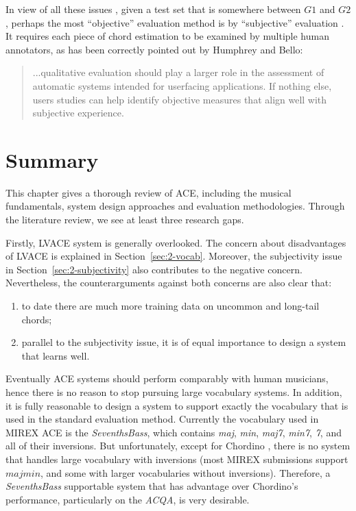 In view of all these issues \cite{humphreyfour,ni2013understanding}, given a test set that is somewhere between $G1$ and $G2$, perhaps the most ``objective'' evaluation method is by ``subjective'' evaluation \cite{harte2010towards}. It requires each piece of chord estimation to be examined by multiple human annotators, as has been correctly pointed out by Humphrey and Bello:
\begin{quote}
...qualitative evaluation should play a larger role in the assessment of automatic systems intended for userfacing applications. If nothing else, users studies can help identify objective measures that align well with subjective experience.
\end{quote}

\section{Summary} \label{sec:2-summary}
This chapter gives a thorough review of ACE, including the musical fundamentals, system design approaches and evaluation methodologies. Through the literature review, we see at least three research gaps.

Firstly, LVACE system is generally overlooked. The concern about disadvantages of LVACE is explained in Section~\ref{sec:2-vocab}. Moreover, the subjectivity issue in Section~\ref{sec:2-subjectivity} also contributes to the negative concern. Nevertheless, the counterarguments against both concerns are also clear that:
\begin{enumerate}
\item to date there are much more training data on uncommon and long-tail chords;
\item parallel to the subjectivity issue, it is of equal importance to design a system that learns well.
\end{enumerate}
Eventually ACE systems should perform comparably with human musicians, hence there is no reason to stop pursuing large vocabulary systems. In addition, it is fully reasonable to design a system to support exactly the vocabulary that is used in the standard evaluation method. Currently the vocabulary used in MIREX ACE is the \textit{SeventhsBass}, which contains \textit{maj}, \textit{min}, \textit{maj7}, \textit{min7}, \textit{7}, and all of their inversions. But unfortunately, except for Chordino \cite{cannam2010sonic}, there is no system that handles large vocabulary with inversions (most MIREX submissions support $majmin$, and some with larger vocabularies without inversions). Therefore, a \textit{SeventhsBass} supportable system that has advantage over Chordino's performance, particularly on the \textit{ACQA}, is very desirable.

